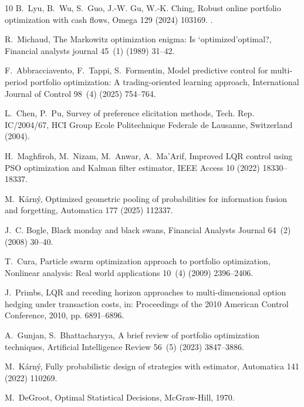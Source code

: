 \documentclass[final,3p,times,twocolumn]{elsarticle}
\begin{document}
\begin{thebibliography}{10}
B.~Lyu, B.~Wu, S.~Guo, J.-W. Gu, W.-K. Ching, Robust online portfolio
  optimization with cash flows, Omega 129 (2024) 103169.
\newblock \href {https://doi.org/https://doi.org/10.1016/j.omega.2024.103169}
  {}.

R.~Michaud, The {M}arkowitz optimization enigma: {I}s ‘optimized’optimal?,
  Financial analysts journal 45~(1) (1989) 31--42.

F.~Abbracciavento, F.~Tappi, S.~Formentin, Model predictive control for
  multi-period portfolio optimization: {A} trading-oriented learning approach,
  International Journal of Control 98~(4) (2025) 754--764.

L.~Chen, P.~Pu, Survey of preference elicitation methods, Tech. Rep.
  IC/2004/67, HCI Group Ecole Politechnique Federale de Lausanne, Switzerland
  (2004).

H.~Maghfiroh, M.~Nizam, M.~Anwar, A.~Ma’Arif, Improved {LQR} control using
  {PSO} optimization and {K}alman filter estimator, IEEE Access 10 (2022)
  18330--18337.

M.~K{\'{a}}rn{\'{y}}, Optimized geometric pooling of probabilities for
  information fusion and forgetting, Automatica 177 (2025) 112337.

J.~C. Bogle, Black monday and black swans, Financial Analysts Journal 64~(2)
  (2008) 30--40.

T.~Cura, Particle swarm optimization approach to portfolio optimization,
  Nonlinear analysis: {R}eal world applications 10~(4) (2009) 2396--2406.

J.~Primbs, {LQR} and receding horizon approaches to multi-dimensional option
  hedging under transaction costs, in: Proceedings of the 2010 American Control
  Conference, 2010, pp. 6891--6896.

A.~Gunjan, S.~Bhattacharyya, A brief review of portfolio optimization
  techniques, Artificial Intelligence Review 56~(5) (2023) 3847--3886.

M.~K{\'a}rn{\'y}, Fully probabilistic design of strategies with estimator,
  Automatica 141 (2022) 110269.

M.~DeGroot, Optimal Statistical Decisions, McGraw-Hill, 1970.


\end{thebibliography}
\end{document}
